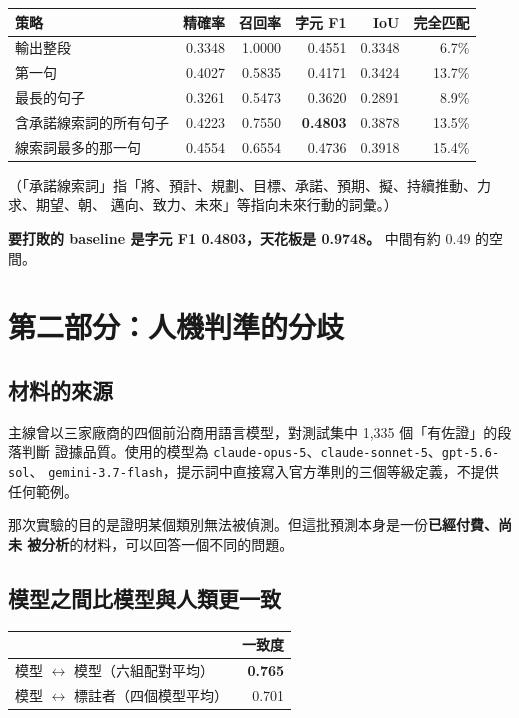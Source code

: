 \documentclass[11pt,a4paper]{ctexart}
\newcommand{\fn}[1]{\texttt{#1}}
\begin{document}
\begin{table}[h]
\centering\small
\begin{tabular}{@{}lrrrrr@{}}
\toprule
策略 & 精確率 & 召回率 & 字元 F1 & IoU & 完全匹配 \\
\midrule
輸出整段 & 0.3348 & 1.0000 & 0.4551 & 0.3348 & 6.7\% \\
第一句 & 0.4027 & 0.5835 & 0.4171 & 0.3424 & 13.7\% \\
最長的句子 & 0.3261 & 0.5473 & 0.3620 & 0.2891 & 8.9\% \\
\rowcolor{yellow!12}
含承諾線索詞的所有句子 & 0.4223 & 0.7550 & \textbf{0.4803} & 0.3878 & 13.5\% \\
線索詞最多的那一句 & 0.4554 & 0.6554 & 0.4736 & 0.3918 & 15.4\% \\
\bottomrule
\end{tabular}
\end{table}

（「承諾線索詞」指「將、預計、規劃、目標、承諾、預期、擬、持續推動、力求、期望、朝、
邁向、致力、未來」等指向未來行動的詞彙。）

\textbf{要打敗的 baseline 是字元 F1 0.4803，天花板是 0.9748。} 中間有約 0.49 的空間。

\section{第二部分：人機判準的分歧}
\label{sec:divergence}

\subsection{材料的來源}

主線曾以三家廠商的四個前沿商用語言模型，對測試集中 1{,}335 個「有佐證」的段落判斷
證據品質。使用的模型為 \fn{claude-opus-5}、\fn{claude-sonnet-5}、\fn{gpt-5.6-sol}、
\fn{gemini-3.7-flash}，提示詞中直接寫入官方準則的三個等級定義，不提供任何範例。

那次實驗的目的是證明某個類別無法被偵測。但這批預測本身是一份\textbf{已經付費、尚未
被分析}的材料，可以回答一個不同的問題。

\subsection{模型之間比模型與人類更一致}

\begin{table}[h]
\centering\small
\begin{tabular}{@{}lr@{}}
\toprule
 & 一致度 \\
\midrule
模型 $\leftrightarrow$ 模型（六組配對平均） & \textbf{0.765} \\
模型 $\leftrightarrow$ 標註者（四個模型平均） & 0.701 \\
\bottomrule
\end{tabular}
\end{table}
\end{document}

